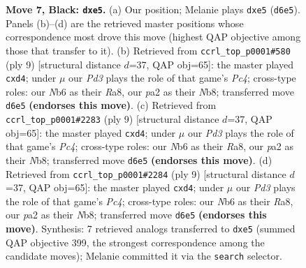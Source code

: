 \documentclass[11pt]{article}
\begin{document}
\begin{figure}[p]
\caption{\textbf{Move 7, Black: \texttt{dxe5}.} (a) Our position; Melanie plays \texttt{dxe5} (\texttt{d6e5}). Panels (b)--(d) are the retrieved master positions whose correspondence most drove this move (highest QAP objective among those that transfer to it). (b) Retrieved from \texttt{ccrl\_top\_p0001\#580} (ply 9) [structural distance $d$=37, QAP obj=65]: the master played \texttt{cxd4}; under $\mu$ our \emph{Pd3} plays the role of that game's \emph{Pc4}; cross-type roles: our \emph{N}b6 as their \emph{R}a8, our \emph{p}a2 as their \emph{N}b8; transferred move \texttt{d6e5} \textbf{(endorses this move)}. (c) Retrieved from \texttt{ccrl\_top\_p0001\#2283} (ply 9) [structural distance $d$=37, QAP obj=65]: the master played \texttt{cxd4}; under $\mu$ our \emph{Pd3} plays the role of that game's \emph{Pc4}; cross-type roles: our \emph{N}b6 as their \emph{R}a8, our \emph{p}a2 as their \emph{N}b8; transferred move \texttt{d6e5} \textbf{(endorses this move)}. (d) Retrieved from \texttt{ccrl\_top\_p0001\#2284} (ply 9) [structural distance $d$=37, QAP obj=65]: the master played \texttt{cxd4}; under $\mu$ our \emph{Pd3} plays the role of that game's \emph{Pc4}; cross-type roles: our \emph{N}b6 as their \emph{R}a8, our \emph{p}a2 as their \emph{N}b8; transferred move \texttt{d6e5} \textbf{(endorses this move)}. Synthesis: 7 retrieved analogs transferred to \texttt{dxe5} (summed QAP objective 399, the strongest correspondence among the candidate moves); Melanie committed it via the \texttt{search} selector.}
\label{fig:thought-m13}
\end{figure}

\clearpage
\end{document}
